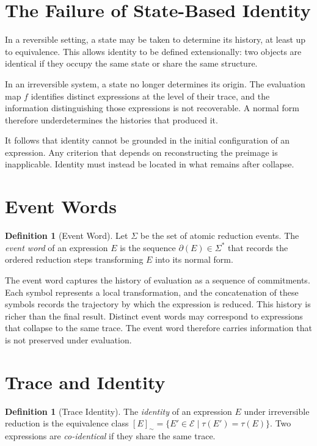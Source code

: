 \documentclass[12pt, oneside]{amsbook}
\theoremstyle{plain}
\theoremstyle{definition}
\newtheorem{definition}[theorem]{Definition}
\theoremstyle{remark}
\newcommand{\Expr}{\mathcal{E}}
\newcommand{\evalf}{f}
\newcommand{\trace}{\tau}
\newcommand{\tequiv}{\sim}
\newcommand{\eventword}{\partial}
\begin{document}
\section{The Failure of State-Based Identity}
\label{sec:identity:failure}

In a reversible setting, a state may be taken to determine its history, at
least up to equivalence. This allows identity to be defined extensionally: two
objects are identical if they occupy the same state or share the same structure.

In an irreversible system, a state no longer determines its origin. The
evaluation map $\evalf$ identifies distinct expressions at the level of their
trace, and the information distinguishing those expressions is not recoverable.
A normal form therefore underdetermines the histories that produced it.

It follows that identity cannot be grounded in the initial configuration of an
expression. Any criterion that depends on reconstructing the preimage is
inapplicable. Identity must instead be located in what remains after collapse.

\section{Event Words}
\label{sec:identity:eventword}

\begin{definition}[Event Word]
\label{def:event-word}
Let $\Sigma$ be the set of atomic reduction events. The \emph{event word} of an
expression $E$ is the sequence $\eventword(E) \in \Sigma^*$ that records the
ordered reduction steps transforming $E$ into its normal form.
\end{definition}

The event word captures the history of evaluation as a sequence of commitments.
Each symbol represents a local transformation, and the concatenation of these
symbols records the trajectory by which the expression is reduced. This history
is richer than the final result. Distinct event words may correspond to
expressions that collapse to the same trace. The event word therefore carries
information that is not preserved under evaluation.

\section{Trace and Identity}
\label{sec:identity:defn}

\begin{definition}[Trace Identity]
\label{def:identity}
The \emph{identity} of an expression $E$ under irreversible reduction is the
equivalence class
$[E]_{\tequiv} = \{ E' \in \Expr \mid \trace(E') = \trace(E) \}$.
Two expressions are \emph{co-identical} if they share the same trace.
\end{definition}
\end{document}
